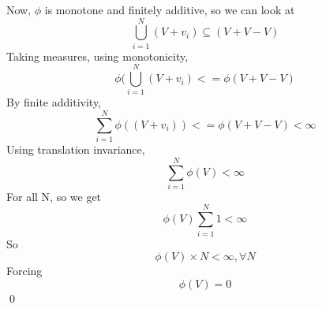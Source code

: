 \documentclass[11pt,oneside]{article}
\numberwithin{equation}{section}
\theoremstyle{definition}
\newtheorem{exercise}{Exercise}
\begin{document}
\begin{solution}
\begin{enumerate}[(a)]
    Now, $\phi$ is monotone and finitely additive, so we can look at
    $$
    \bigcup \limits _ { i = 1}^N (V + v_i) \subseteq (V + V - V)
    $$
    Taking measures, using monotonicity, 
    $$
    \phi( \bigcup  \limits _ {i=1}^N (V + v_i) <= \phi(V + V - V)
    $$
    By finite additivity,
    $$
    \sum  \limits _ {i=1}^N \phi((V + v_i)) <= \phi(V + V - V) < \infty
    $$
    Using translation invariance, 
    $$
    \sum  \limits _ {i=1}^N \phi(V) < \infty
    $$
    For all N, so we get
    $$
    \phi(V) \sum \limits_{i=1} ^ N 1 < \infty
    $$
    So 
    $$
    \phi(V) \times N < \infty, \forall N
    $$
    Forcing
    $$ \phi(V) = 0
    $$
    \qed
\end{enumerate}
\end{solution}


\begin{comment}
\begin{exercise}
  problem
\end{exercise}
\begin{solution}
\begin{enumerate}[(a)]
\item
  first answer
\end{enumerate}
\end{solution}
\end{comment}
\end{document}
